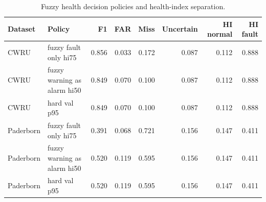 \begin{table}[t]
\centering
\caption{Fuzzy health decision policies and health-index separation.}
\label{tab:fuzzy_health}
\small
\begin{tabular}{llrrrrrr}
\toprule
Dataset & Policy & F1 & FAR & Miss & Uncertain & HI normal & HI fault \\
\midrule
CWRU & fuzzy fault only hi75 & 0.856 & 0.033 & 0.172 & 0.087 & 0.112 & 0.888 \\
CWRU & fuzzy warning as alarm hi50 & 0.849 & 0.070 & 0.100 & 0.087 & 0.112 & 0.888 \\
CWRU & hard val p95 & 0.849 & 0.070 & 0.100 & 0.087 & 0.112 & 0.888 \\
Paderborn & fuzzy fault only hi75 & 0.391 & 0.068 & 0.721 & 0.156 & 0.147 & 0.411 \\
Paderborn & fuzzy warning as alarm hi50 & 0.520 & 0.119 & 0.595 & 0.156 & 0.147 & 0.411 \\
Paderborn & hard val p95 & 0.520 & 0.119 & 0.595 & 0.156 & 0.147 & 0.411 \\
\bottomrule
\end{tabular}
\end{table}
